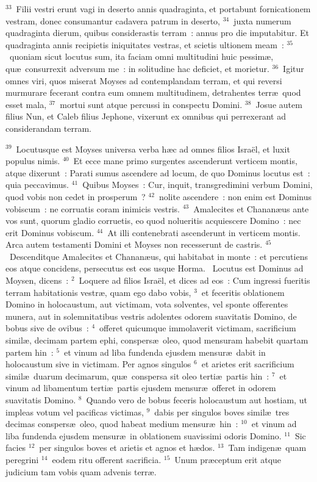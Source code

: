 ${}^{33}$~Filii vestri erunt vagi in deserto annis quadraginta, et portabunt fornicationem vestram, donec consumantur cadavera patrum in deserto,
${}^{34}$~juxta numerum quadraginta dierum, quibus considerastis terram~: annus pro die imputabitur. Et quadraginta annis recipietis iniquitates vestras, et scietis ultionem meam~:
${}^{35}$~quoniam sicut locutus sum, ita faciam omni multitudini huic pessim\ae , qu\ae\ consurrexit adversum me~: in solitudine hac deficiet, et morietur.
${}^{36}$~Igitur omnes viri, quos miserat Moyses ad contemplandam terram, et qui reversi murmurare fecerant contra eum omnem multitudinem, detrahentes terr\ae\ quod esset mala,
${}^{37}$~mortui sunt atque percussi in conspectu Domini.
${}^{38}$~Josue autem filius Nun, et Caleb filius Jephone, vixerunt ex omnibus qui perrexerant ad considerandam terram.


${}^{39}$~Locutusque est Moyses universa verba h\ae c ad omnes filios Isra\"el, et luxit populus nimis.
${}^{40}$~Et ecce mane primo surgentes ascenderunt verticem montis, atque dixerunt~: Parati sumus ascendere ad locum, de quo Dominus locutus est~: quia peccavimus.
${}^{41}$~Quibus Moyses~: Cur, inquit, transgredimini verbum Domini, quod vobis non cedet in prosperum~?
${}^{42}$~nolite ascendere~: non enim est Dominus vobiscum~: ne corruatis coram inimicis vestris.
${}^{43}$~Amalecites et Chanan\ae us ante vos sunt, quorum gladio corruetis, eo quod nolueritis acquiescere Domino~: nec erit Dominus vobiscum.
${}^{44}$~At illi contenebrati ascenderunt in verticem montis. Arca autem testamenti Domini et Moyses non recesserunt de castris.
${}^{45}$~Descenditque Amalecites et Chanan\ae us, qui habitabat in monte~: et percutiens eos atque concidens, persecutus est eos usque Horma.
~\lettrine[lines=10,image=true,loversize=0.05,lraise=-0.03]{L}{}ocutus est Dominus ad Moysen, dicens~:
${}^{2}$~Loquere ad filios Isra\"el, et dices ad eos~: Cum ingressi fueritis terram habitationis vestr\ae , quam ego dabo vobis,
${}^{3}$~et feceritis oblationem Domino in holocaustum, aut victimam, vota solventes, vel sponte offerentes munera, aut in solemnitatibus vestris adolentes odorem suavitatis Domino, de bobus sive de ovibus~:
${}^{4}$~offeret quicumque immolaverit victimam, sacrificium simil\ae , decimam partem ephi, conspers\ae\ oleo, quod mensuram habebit quartam partem hin~:
${}^{5}$~et vinum ad liba fundenda ejusdem mensur\ae\ dabit in holocaustum sive in victimam. Per agnos singulos
${}^{6}$~et arietes erit sacrificium simil\ae\ duarum decimarum, qu\ae\ conspersa sit oleo terti\ae\ partis hin~:
${}^{7}$~et vinum ad libamentum terti\ae\ partis ejusdem mensur\ae\ offeret in odorem suavitatis Domino.
${}^{8}$~Quando vero de bobus feceris holocaustum aut hostiam, ut impleas votum vel pacificas victimas,
${}^{9}$~dabis per singulos boves simil\ae\ tres decimas conspers\ae\ oleo, quod habeat medium mensur\ae\ hin~:
${}^{10}$~et vinum ad liba fundenda ejusdem mensur\ae\ in oblationem suavissimi odoris Domino.
${}^{11}$~Sic facies
${}^{12}$~per singulos boves et arietis et agnos et h\ae dos.
${}^{13}$~Tam indigen\ae\ quam peregrini
${}^{14}$~eodem ritu offerent sacrificia.
${}^{15}$~Unum pr\ae ceptum erit atque judicium tam vobis quam advenis terr\ae .


